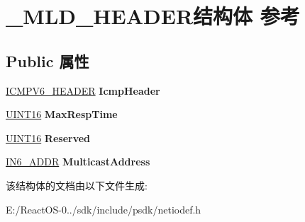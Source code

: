 \hypertarget{struct___m_l_d___h_e_a_d_e_r}{}\section{\+\_\+\+M\+L\+D\+\_\+\+H\+E\+A\+D\+E\+R结构体 参考}
\label{struct___m_l_d___h_e_a_d_e_r}
\subsection*{Public 属性}
\begin{DoxyCompactItemize}
\item 
\mbox{\label{struct___m_l_d___h_e_a_d_e_r_a9043c2753f543cf1b72835078626f054}} 
\hyperlink{struct_i_c_m_p___h_e_a_d_e_r}{I\+C\+M\+P\+V6\+\_\+\+H\+E\+A\+D\+ER} {\bfseries Icmp\+Header}
\item 
\mbox{\label{struct___m_l_d___h_e_a_d_e_r_ac4e61231291403364e7496381a02513b}} 
\hyperlink{_processor_bind_8h_a09f1a1fb2293e33483cc8d44aefb1eb1}{U\+I\+N\+T16} {\bfseries Max\+Resp\+Time}
\item 
\mbox{\label{struct___m_l_d___h_e_a_d_e_r_ae65a75467d99821b20cb68d918d47c71}} 
\hyperlink{_processor_bind_8h_a09f1a1fb2293e33483cc8d44aefb1eb1}{U\+I\+N\+T16} {\bfseries Reserved}
\item 
\mbox{\label{struct___m_l_d___h_e_a_d_e_r_afb23fc42501ad96a685dead4a1bfcd13}} 
\hyperlink{structin6__addr}{I\+N6\+\_\+\+A\+D\+DR} {\bfseries Multicast\+Address}
\end{DoxyCompactItemize}


该结构体的文档由以下文件生成\+:\begin{DoxyCompactItemize}
\item 
E\+:/\+React\+O\+S-\/0../sdk/include/psdk/netiodef.\+h\end{DoxyCompactItemize}
